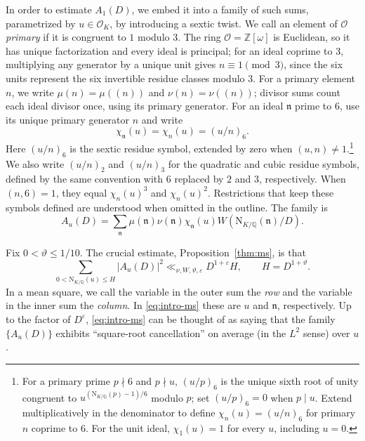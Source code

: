\documentclass[11pt,a4paper]{article}
\numberwithin{equation}{section}
\numberwithin{figure}{section}
\theoremstyle{definition}
\theoremstyle{remark}
\newcommand{\Q}{\mathbb Q}
\newcommand{\NK}{\mathrm N_{K/\Q}}
\newcommand{\OO}{\mathcal O}
\begin{document}
In order to estimate $A_1(D)$, we embed it into a family of such sums,
parametrized by $u\in\OO_K$, by introducing a sextic twist.
We call an element of $\OO$ \emph{primary} if it is congruent to $1$
modulo $3$. The ring $\OO=\mathbb Z[\omega]$ is Euclidean, so it has unique
factorization and every ideal is principal; for an ideal coprime to $3$,
multiplying any generator by a unique unit gives $n\equiv1\pmod3$,
since the six units represent the six invertible residue classes modulo $3$.
For a primary element $n$, we write $\mu(n)=\mu((n))$ and $\nu(n)=\nu((n))$;
divisor sums count each ideal divisor once, using its primary generator.
For an ideal $\mathfrak n$ prime to $6$, use its unique primary generator
$n$ and write
\[
 \chi_{\mathfrak n}(u)=\chi_n(u)=(u/n)_6.
\]
Here $(u/n)_6$ is the sextic residue symbol, extended by zero
when $(u,n)\neq 1$.\footnote{For a primary prime $p\nmid6$ and $p\nmid u$,
$(u/p)_6$ is the unique sixth root of unity congruent to
$u^{(\NK(p)-1)/6}$ modulo $p$; set $(u/p)_6=0$ when $p\mid u$.
Extend multiplicatively in the denominator to define
$\chi_n(u)=(u/n)_6$ for primary $n$ coprime to $6$.
For the unit ideal, $\chi_1(u)=1$ for every $u$, including $u=0$.
}
We also write $(u/n)_2$ and $(u/n)_3$ for the quadratic and cubic residue symbols, defined by the same convention with $6$ replaced by $2$ and $3$, respectively. When $(n,6)=1$, they equal $\chi_n(u)^3$ and $\chi_n(u)^2$. Restrictions that keep these symbols defined are understood when omitted in the outline.
The family is
\begin{equation}\label{eq:intro-family}
 A_u(D)=\sum_{\mathfrak n}
   \mu(\mathfrak n)\nu(\mathfrak n)\chi_{\mathfrak n}(u)
   W(\NK(\mathfrak n)/D).
\end{equation}

Fix $0<\vartheta\le1/10$. The crucial estimate, Proposition~\ref{thm:ms}, is that
\begin{equation}\label{eq:intro-ms}
 \sum_{0<\NK(u)\le H}|A_u(D)|^2
       \ll_{\nu,W,\vartheta,\varepsilon}D^{1+\varepsilon}H,
 \qquad H=D^{1+\vartheta}.
\end{equation}
In a mean square, we call the variable in the outer sum the \emph{row}
and the variable in the inner sum the \emph{column}. In
\eqref{eq:intro-ms} these are $u$ and $\mathfrak n$, respectively.
Up to the factor of $D^\varepsilon$, \eqref{eq:intro-ms} can be thought of as saying that the family $\{A_u(D)\}$ exhibits ``square-root cancellation'' on average (in the $L^2$ sense) over $u$.
\end{document}
